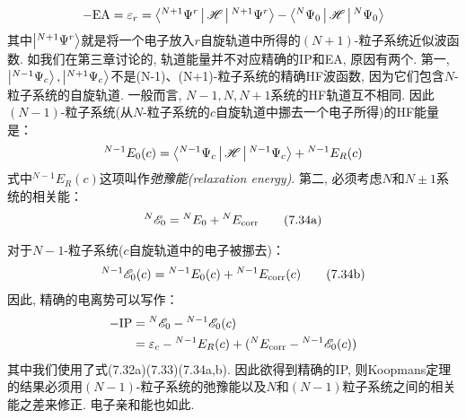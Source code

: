 \begin{align}
-\mathrm{EA} = \varepsilon_r = \Braket{^{N+1}\Psi^r|\mathscr{H}| ^{N+1}\Psi^r} - \Braket{^{N}\Psi_0|\mathscr{H}|^{N}\Psi_0}
\end{align}
其中$\Ket{^{N+1}\Psi^r}$就是将一个电子放入$r$自旋轨道中所得的$(N+1)$-粒子系统近似波函数. 
如我们在第三章讨论的, 
轨道能量并不对应精确的IP和EA, 
原因有两个. 
第一,
$\Ket{^{N-1}\Psi_c},\Ket{^{N+1}\Psi_c}$不是(N-1)、(N+1)-粒子系统的精确HF波函数, 
因为它们包含$N$-粒子系统的自旋轨道. 
一般而言, 
$N-1,N,N+1$系统的HF轨道互不相同. 
因此$(N-1)$-粒子系统(从$N$-粒子系统的$c$自旋轨道中挪去一个电子所得)的HF能量是：
\begin{align}
{}^{N-1}E_0(c) = \Braket{{}^{N-1}\Psi_c|\mathscr{H}|{}^{N-1}\Psi_c} + {}^{N-1}E_R(c)
\end{align}
式中${}^{N-1}E_R(c)$这项叫作\emph{弛豫能(relaxation energy)}. 
第二, 
必须考虑$N$和$N\pm1$系统的相关能：
\begin{align}
{}^N\mathscr{E}_0 = {}^NE_0 + {}^NE_\mathrm{corr}\tag{7.34a}
\end{align}
\addtocounter{equation}{-1}
对于$N-1$-粒子系统($c$自旋轨道中的电子被挪去)：
\begin{align}
{}^{N-1}\mathscr{E}_0(c) = {}^{N-1}E_0(c) + {}^{N-1}E_\mathrm{corr}(c)\tag{7.34b}
\end{align}
因此, 
精确的电离势可以写作：
\begin{align}
-\mathrm{IP} & = {}^N\mathscr{E}_0 - {}^{N-1}\mathscr{E}_0(c)\notag\\
             & = \varepsilon_c - {}^{N-1}E_R(c) + ({}^NE_\mathrm{corr} - {}^{N-1}\mathscr{E}_0(c))
\end{align}
其中我们使用了式(7.32a)(7.33)(7.34a,b). 
因此欲得到精确的IP, 
则Koopmans定理的结果必须用$(N-1)$-粒子系统的弛豫能以及$N$和$(N-1)$粒子系统之间的相关能之差来修正. 
电子亲和能也如此. 

